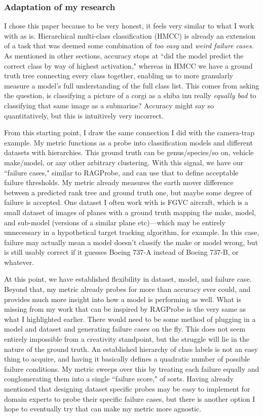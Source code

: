 \documentclass{article}
\begin{document}
\subsubsection{Adaptation of my research}
I chose this paper because to be very honest, it feels very similar to what I work with as is.
Hierarchical multi-class classification (HMCC) is already an extension of a task that was deemed some combination of \textit{too easy} and \textit{weird failure cases}.
As mentioned in other sections, accuracy stops at ``did the model predict the correct class by way of highest activation," whereas in HMCC we have a ground truth tree connecting every class together, enabling us to more granularly measure a model's full understanding of the full class list.
This comes from asking the question, is classifying a picture of a corgi as a shiba inu really \textit{equally bad} to classifying that same image as a submarine? 
Accuracy might say so quantitatively, but this is intuitively very incorrect.

From this starting point, I draw the same connection I did with the camera-trap example. 
My metric functions as a probe into classification models and different datasets with hierarchies. 
This ground truth can be genus/species/so on, vehicle make/model, or any other arbitrary clustering.
With this signal, we have our ``failure cases," similar to RAGProbe, and can use that to define acceptable failure thresholds.
My metric already measures the earth mover difference between a predicted rank tree and ground truth one, but maybe some degree of failure is accepted.
One dataset I often work with is FGVC aircraft, which is a small dataset of images of planes with a ground truth mapping the make, model, and sub-model (versions of a similar plane etc)—which may be entirely unnecessary in a hypothetical target tracking algorithm, for example.
In this case, failure may actually mean a model doesn't classify the make or model wrong, but is still usably correct if it guesses Boeing 737-A instead of Boeing 737-B, or whatever. 

At this point, we have established flexibility in dataset, model, and failure case. 
Beyond that, my metric already probes for more than accuracy ever could, and provides much more insight into how a model is performing as well.
What is missing from my work that can be inspired by RAGProbe is the very same as what I highlighted earlier. 
There would need to be some method of plugging in a model and dataset and generating failure cases on the fly. 
This does not seem entirely impossible from a creativity standpoint, but the struggle will lie in the nature of the ground truth.
An established hierarchy of class labels is not an easy thing to acquire, and having it basically defines a quadratic number of possible failure conditions. 
My metric sweeps over this by treating each failure equally and conglomerating them into a single ``failure score," of sorts. 
Having already mentioned that designing dataset specific probes may be easy to implement for domain experts to probe their specific failure cases, but there is another option I hope to eventually try that can make my metric more agnostic.
\end{document}
